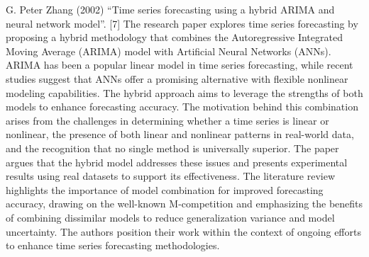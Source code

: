         G. Peter Zhang (2002) “Time series forecasting using a hybrid ARIMA and neural network model”. [7] The research paper explores time series forecasting by proposing a hybrid methodology that combines the Autoregressive Integrated Moving Average (ARIMA) model with Artificial Neural Networks (ANNs). ARIMA has been a popular linear model in time series forecasting, while recent studies suggest that ANNs offer a promising alternative with flexible nonlinear modeling capabilities. The hybrid approach aims to leverage the strengths of both models to enhance forecasting accuracy. The motivation behind this combination arises from the challenges in determining whether a time series is linear or nonlinear, the presence of both linear and nonlinear patterns in real-world data, and the recognition that no single method is universally superior. The paper argues that the hybrid model addresses these issues and presents experimental results using real datasets to support its effectiveness. The literature review highlights the importance of model combination for improved forecasting accuracy, drawing on the well-known M-competition and emphasizing the benefits of combining dissimilar models to reduce generalization variance and model uncertainty. The authors position their work within the context of ongoing efforts to enhance time series forecasting methodologies.

